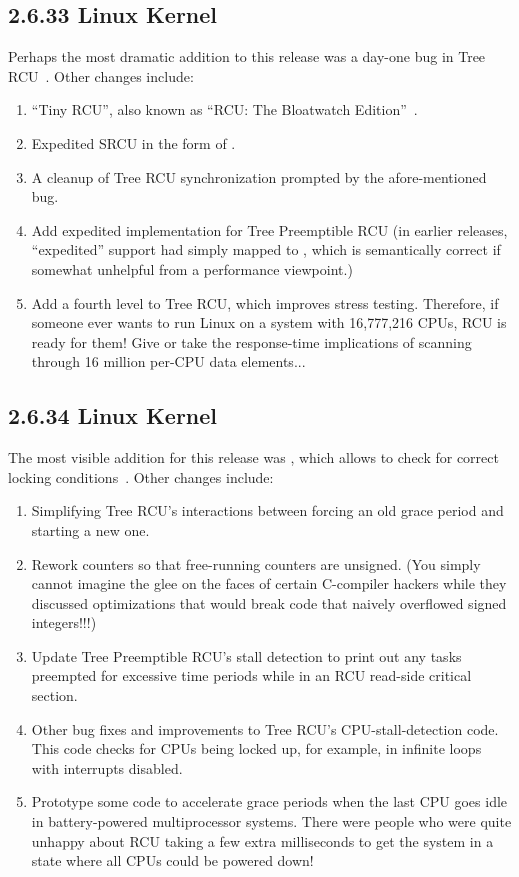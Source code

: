\subsection{2.6.33 Linux Kernel}

Perhaps the most dramatic addition to this release was
a day-one bug in Tree RCU~\cite{PaulEMcKenney2009HuntingHeisenbugs}.
Other changes include:

\begin{enumerate}
\item	``Tiny RCU'', also known as ``RCU: The Bloatwatch
	Edition''~\cite{PaulEMcKenney2009LWNBloatWatchRCU}.
\item	Expedited SRCU in the form of
	.
\item	A cleanup of Tree RCU synchronization prompted by the
	afore-mentioned bug.
\item	Add expedited implementation for Tree Preemptible RCU
	(in earlier releases, ``expedited'' support had simply
	mapped to , which is semantically
	correct if somewhat unhelpful from a performance viewpoint.)
\item	Add a fourth level to Tree RCU, which improves stress testing.
	Therefore, if someone ever wants to run Linux on a system with
	16,777,216 CPUs, RCU is ready for them!
	Give or take the response-time implications of scanning
	through 16 million per-CPU data elements...
\end{enumerate}

\subsection{2.6.34 Linux Kernel}

The most visible addition for this release was ,
which allows  to check for correct locking
conditions~\cite{PaulEMcKenney2010LockdepRCU}.
Other changes include:

\begin{enumerate}
\item	Simplifying Tree RCU's interactions between
	forcing an old grace period and starting a new one.
\item	Rework counters so that free-running counters are unsigned.
	(You simply cannot imagine the glee on the faces of certain
	C-compiler hackers while they discussed optimizations that would
	break code that naively overflowed signed integers!!!)
\item	Update Tree Preemptible RCU's stall detection to print out
	any tasks preempted for excessive time periods while in
	an RCU read-side critical section.
\item	Other bug fixes and improvements to Tree RCU's CPU-stall-detection
	code.
	This code checks for CPUs being locked up, for example,
	in infinite loops with interrupts disabled.
\item	Prototype some code to accelerate grace periods when the
	last CPU goes idle in battery-powered multiprocessor
	systems.
	There were people who were quite unhappy about RCU taking
	a few extra milliseconds to get the system in a state
	where all CPUs could be powered down!
\end{enumerate}

